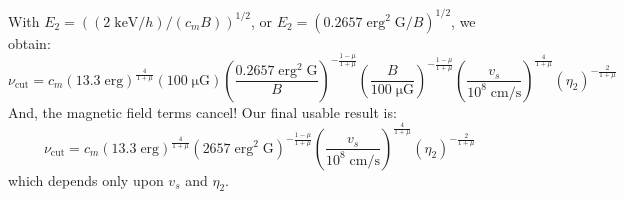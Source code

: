 \documentclass[iop, apj, numberedappendix]{emulateapj}
\newcommand*{\mt}{\mathrm}
\newcommand*{\unit}[1]{\;\mt{#1}}  %
\newcommand*{\muG}{\unit{\mu G}}
\begin{document}
With $E_2 = \left( (2 \unit{keV}/h) / (c_m B) \right)^{1/2}$, or
$E_2 = \left( 0.2657 \unit{erg^2\;G} / B \right)^{1/2}$, we obtain:
\[
    \nu_{\mt{cut}} = c_m
        \left( 13.3 \unit{erg} \right)^{\frac{4}{1+\mu}}
        \left( 100 \muG \right)
        \left( \frac{0.2657 \unit{erg^2\;G}}{B} \right)^{-\frac{1-\mu}{1+\mu}}
        \left( \frac{B}{100\muG} \right)^{-\frac{1-\mu}{1+\mu}}
        \left( \frac{v_s}{10^8 \unit{cm/s}} \right)^{\frac{4}{1+\mu}}
        \left( \eta_2 \right)^{-\frac{2}{1+\mu}}
\]
And, the magnetic field terms cancel!  Our final usable result is:
\begin{equation}
    \nu_{\mt{cut}} = c_m
        \left( 13.3 \unit{erg} \right)^{\frac{4}{1+\mu}}
        \left( 2657 \unit{erg^2\;G} \right)^{-\frac{1-\mu}{1+\mu}}
        \left( \frac{v_s}{10^8 \unit{cm/s}} \right)^{\frac{4}{1+\mu}}
        \left( \eta_2 \right)^{-\frac{2}{1+\mu}}
\end{equation}
which depends only upon $v_s$ and $\eta_2$.



\end{document}

